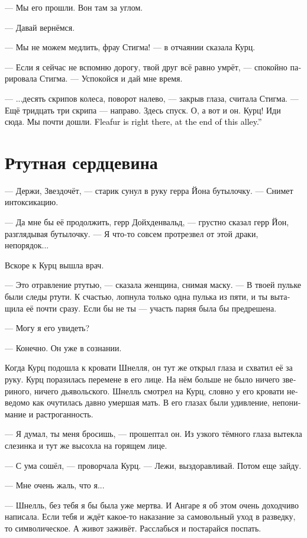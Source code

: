 \documentclass[a4paper,12pt,fleqn]{book}\usepackage{cooltooltips}\usepackage{polyglossia}\setdefaultlanguage[babelshorthands=true]{russian}\setotherlanguage{english}\defaultfontfeatures{Ligatures=TeX,Mapping=tex-text} \usepackage{xcolor}\definecolor{lightgray}{HTML}{bbbbbb}\color{lightgray}\newcommand{\ml}[3]{\textenglish{\textcolor{black}{#3}}}
\begin{document}
--- Мы его прошли.
Вон там за углом.

--- Давай вернёмся.

--- Мы не можем медлить, фрау Стигма! --- в отчаянии сказала Курц.

--- Если я сейчас не вспомню дорогу, твой друг всё равно умрёт, --- спокойно парировала Стигма.
--- Успокойся и дай мне время.

--- ...десять скрипов колеса, поворот налево, --- закрыв глаза, считала Стигма.
--- Ещё тридцать три скрипа --- направо.
Здесь спуск.
О, а вот и он.
Курц!
Иди сюда.
Мы почти дошли.
\ml{$0$}
{Блошница вон там, внизу этой улицы.}
{Fleafur is right there, at the end of this alley.''} %

\section{Ртутная сердцевина}

--- Держи, Звездочёт, --- старик сунул в руку герра Йона бутылочку.
--- Снимет интоксикацию.

--- Да мне бы её продолжить, герр Дойхденвальд, --- грустно сказал герр Йон, разглядывая бутылочку.
--- Я что-то совсем протрезвел от этой драки, непорядок...

Вскоре к Курц вышла врач.

--- Это отравление ртутью, --- сказала женщина, снимая маску.
--- В твоей пульке были следы ртути.
К счастью, лопнула только одна пулька из пяти, и ты вытащила её почти сразу.
Если бы не ты --- участь парня была бы предрешена.

--- Могу я его увидеть?

--- Конечно.
Он уже в сознании.

Когда Курц подошла к кровати Шнелля, он тут же открыл глаза и схватил её за руку.
Курц поразилась перемене в его лице.
На нём больше не было ничего звериного, ничего дьявольского.
Шнелль смотрел на Курц, словно у его кровати неведомо как очутилась давно умершая мать.
В его глазах были удивление, непонимание и растроганность.

--- Я думал, ты меня бросишь, --- прошептал он.
Из узкого тёмного глаза вытекла слезинка и тут же высохла на горящем лице.

--- С ума сошёл, --- проворчала Курц.
--- Лежи, выздоравливай.
Потом еще зайду.

--- Мне очень жаль, что я...

--- Шнелль, без тебя я бы была уже мертва.
И Ангаре я об этом очень доходчиво написала.
Если тебя и ждёт какое-то наказание за самовольный уход в разведку, то символическое.
А живот заживёт.
Расслабься и постарайся поспать.
\end{document}
